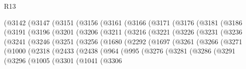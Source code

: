\begin{lexlean}{R13}
\begin{coremodule}
        (@3142
          (@3147
            (@3151
              (@3156
                (@3161
                  (@3166
                    (@3171
                      (@3176
                        (@3181
                          (@3186
                            (@3191
                              (@3196
                                (@3201
                                  (@3206
                                    (@3211
                                      (@3216
                                        (@3221
                                          (@3226
                                            (@3231
                                              (@3236
                                                (@3241
                                                  (@3246
                                                    (@3251
                                                      (@3256
                                                        (@1680
                                                          (@2292
                                                            (@1697
                                                              (@3261
                                                                (@3266
                                                                  (@3271
                                                                    (@1000
                                                                      (@2318
                                                                        (@2433
                                                                          (@2438
                                                                            (@964
                                                                              (@995
                                                                                (@3276
                                                                                  (@3281
                                                                                    (@3286
                                                                                      (@3291
                                                                                        (@3296
                                                                                          (@1005
                                                                                            (@3301
                                                                                              (@1041
                                                                                                (@3306

\end{coremodule}
\end{lexlean}
